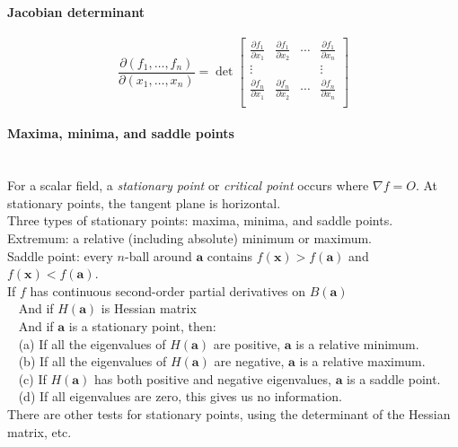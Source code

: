 \documentclass[10pt]{article}
\newcommand{\bs}[1]{\pmb{#1}}
\begin{document}
\paragraph{Jacobian determinant}
\begin{equation*}
\frac{\partial(f_1,\dotsc,f_n)}{\partial(x_1,\dotsc,x_n)} = \det
\begin{bmatrix}
\frac{\partial f_1}{\partial x_1} & \frac{\partial f_1}{\partial x_2} & \cdots & \frac{\partial f_1}{\partial x_n}\\
\vdots & & & \vdots\\
\frac{\partial f_n}{\partial x_1} & \frac{\partial f_n}{\partial x_2} & \cdots & \frac{\partial f_n}{\partial x_n}\\
\end{bmatrix}
\end{equation*}

\paragraph{Maxima, minima, and saddle points}\ \\
For a scalar field, a {\it stationary point} or {\it critical point} occurs where $\nabla f = O$.
At stationary points, the tangent plane is horizontal.\\
Three types of stationary points: maxima, minima, and saddle points.\\
Extremum: a relative (including absolute) minimum or maximum.\\
Saddle point: every $n$-ball around $\bs{a}$ contains $f(\bs{x}) > f(\bs{a})$ and $f(\bs{x}) < f(\bs{a})$.\\
If $f$ has continuous second-order partial derivatives on $B(\bs{a})$\\
$\phantom{x}$ And if $H(\bs{a})$ is Hessian matrix\\
$\phantom{x}$ And if $\bs{a}$ is a stationary point, then:\\
$\phantom{x}$ (a) If all the eigenvalues of $H(\bs{a})$ are positive, $\bs{a}$ is a relative minimum.\\
$\phantom{x}$ (b) If all the eigenvalues of $H(\bs{a})$ are negative, $\bs{a}$ is a relative maximum.\\
$\phantom{x}$ (c) If $H(\bs{a})$ has both positive and negative eigenvalues, $\bs{a}$ is a saddle point.\\
$\phantom{x}$ (d) If all eigenvalues are zero, this gives us no information.\\
There are other tests for stationary points, using the determinant of the Hessian matrix, etc.
\end{document}
